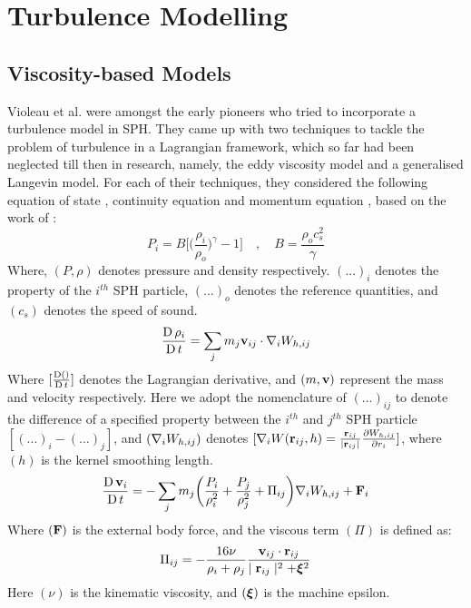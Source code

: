 
\chapter{Turbulence Modelling} %

\label{chap:turbulence-modelling}
\section{Viscosity-based Models}
\label{sec:visc-based-model}
Violeau et al. \parencite{VIOLEAU2002} were amongst the early pioneers who tried to incorporate a turbulence model in SPH. They came up with two techniques to tackle the problem of turbulence in a Lagrangian framework, which so far had been neglected till then in research, namely, the eddy viscosity model and a generalised Langevin model. For each of their techniques, they considered the following equation of state , continuity equation  and momentum equation , based on the work of \parencite{Monaghan1992}:   
\begin{equation}
    P_i = B \Bigg[ \bigg( \frac{\rho_i}{\rho_o} \bigg)^{\gamma} - 1 \Bigg] \quad , \quad B = \frac{\rho_o c_s^2}{\gamma}
    \label{eq:violeau-eos}
\end{equation}
Where, $(P, \rho)$ denotes pressure and density respectively. $(...)_i$ denotes the property of the $i^{th}$ SPH particle, $(...)_o$ denotes the reference quantities, and $(c_s)$ denotes the speed of sound.
\begin{equation}
    \LagDerivative{\rho_i} = \sum_j m_j \VIJ \cdot \DWIJ
    \label{eq:violeau-continuity}
\end{equation}
Where $[\LagDerivative{()}]$ denotes the Lagrangian derivative, and $(m, \vect{v})$ represent the mass and velocity respectively. Here we adopt the nomenclature of $(...)_{ij}$ to denote the difference of a specified property between the $i^{th}$ and $j^{th}$ SPH particle $[(...)_{i} - (...)_{j}]$, and $(\DWIJ)$ denotes $[\nabla_i W(\RIJ,h) = \frac{\RIJ}{\RtwoIJ[]} \PartialDerivative[r_i]{\WIJ}]$, where $(h)$ is the kernel smoothing length.
\begin{equation}
    \LagDerivative{\vect{v}_i} = - \sum_j m_j \bigg( \frac{P_i}{\rho_i^2} + \frac{P_j}{\rho_j^2} + \Pi_{ij} \bigg) \DWIJ + \vect{F}_i
    \label{eq:violeau-mom}
\end{equation}
Where $(\vect{F})$ is the external body force, and the viscous term $(\Pi)$ is defined as:
\begin{equation}
    \Pi_{ij} = - \frac{16\nu}{\rho_i + \rho_j} \frac{\VIJ \cdot \RIJ}{\RtwoIJ + \MachineEpsilon^2} 
    \label{eq:violeau-diffusion-term}
\end{equation}
Here $(\nu)$ is the kinematic viscosity, and $(\MachineEpsilon)$ is the machine epsilon.


